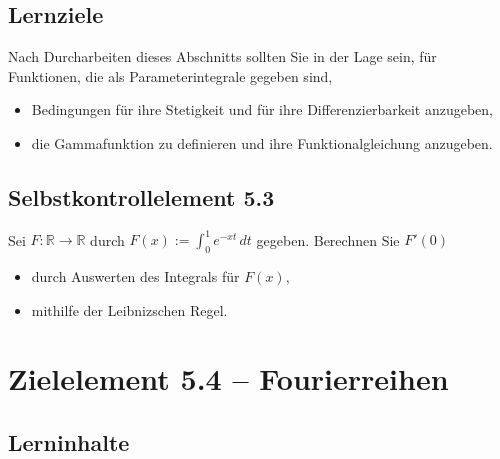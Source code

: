 \documentclass[a4paper,12pt]{article}
\begin{document}
\subsection*{Lernziele}

Nach Durcharbeiten dieses Abschnitts sollten Sie in der Lage sein, für
Funktionen, die als Parameterintegrale gegeben sind,
\begin{itemize}
  \item Bedingungen für ihre Stetigkeit und für ihre Differenzierbarkeit
        anzugeben,
  \item die Gammafunktion zu definieren und ihre Funktionalgleichung anzugeben.
\end{itemize}

\subsection*{Selbstkontrollelement 5.3}

Sei $F: \mathbb{R} \to \mathbb{R}$ durch $F(x) := \displaystyle\int_0^1 e^{-xt}\,dt$
gegeben. Berechnen Sie $F'(0)$
\begin{itemize}
  \item durch Auswerten des Integrals für $F(x)$,
  \item mithilfe der Leibnizschen Regel.
\end{itemize}

\newpage

\section*{Zielelement 5.4 -- Fourierreihen}

\subsection*{Lerninhalte}
\end{document}
